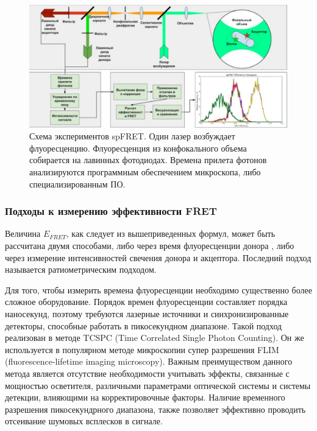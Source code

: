 \begin{figure} [h!]
    \centering
    \includegraphics[width=\textwidth]{images/p1/part1_5_fret/part1_5_fret_f4.pdf}
    \caption[Схема экспериментов spFRET]{Схема экспериментов spFRET. Один лазер возбуждает флуоресценцию. Флуоресценция из конфокального объема собирается на лавинных фотодиодах. Времена прилета фотонов анализируются программным обеспечением микроскопа, либо специализированным ПО.}
    \label{fig:p1_5_fret:f4}
\end{figure}


\subsubsection{Подходы к измерению эффективности FRET}
Величина $E_{FRET}$, как следует из вышеприведенных формул, может быть рассчитана двумя способами, либо через время флуоресценции донора \cite{sisamakis_accurate_2010}, либо через измерение интенсивностей свечения донора и акцептора. Последний подход называется ратиометрическим подходом. 

Для того, чтобы измерить времена флуоресценции необходимо существенно более сложное оборудование. Порядок времен флуоресценции составляет порядка наносекунд, поэтому требуются лазерные источники и синхронизированные детекторы, способные работать в пикосекундном диапазоне. Такой подход реализован в методе TCSPC (Time Correlated Single Photon Counting). Он же используется в популярном методе микроскопии супер разрешения FLIM (fluorescence-lifetime imaging microscopy).
Важным преимуществом данного метода является отсутствие необходимости учитывать эффекты, связанные с мощностью осветителя, различными параметрами оптической системы и системы детекции, влияющими на корректировочные факторы. Наличие временного разрешения пикосекундрного диапазона, также позволяет эффективно проводить отсеивание шумовых всплесков в сигнале.

